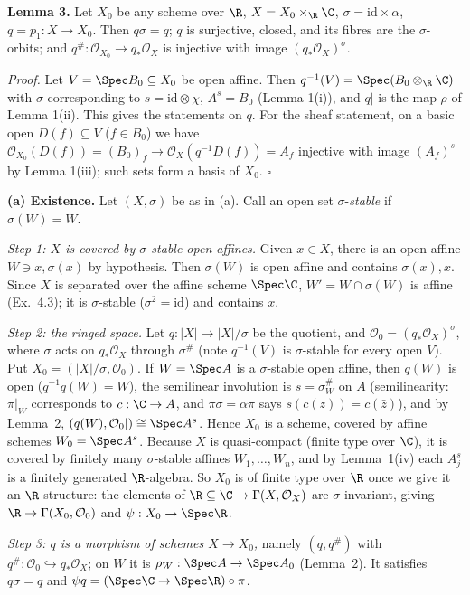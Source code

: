 \documentclass[11pt]{article}
\begin{document}
\textbf{Lemma 3.} Let $X_0$ be any scheme over $\R$, $X=X_0\times_{\R}\C$, $\sigma=\mathrm{id}\times\alpha$, $q=p_1:X\to X_0$. Then $q\sigma=q$; $q$ is surjective, closed, and its fibres are the $\sigma$-orbits; and $q^\#:\mathcal O_{X_0}\to q_*\mathcal O_X$ is injective with image $(q_*\mathcal O_X)^\sigma$.

\emph{Proof.} Let $V=\Spec B_0\subseteq X_0$ be open affine. Then $q^{-1}(V)=\Spec(B_0\otimes_{\R}\C)$ with $\sigma$ corresponding to $s=\mathrm{id}\otimes\chi$, $A^s=B_0$ (Lemma 1(i)), and $q|$ is the map $\rho$ of Lemma 1(ii). This gives the statements on $q$. For the sheaf statement, on a basic open $D(f)\subseteq V$ ($f\in B_0$) we have $\mathcal O_{X_0}(D(f))=(B_0)_f\to\mathcal O_X(q^{-1}D(f))=A_f$ injective with image $(A_f)^s$ by Lemma 1(iii); such sets form a basis of $X_0$. $\square$

\textbf{(a) Existence.} Let $(X,\sigma)$ be as in (a). Call an open set $\sigma$-\emph{stable} if $\sigma(W)=W$.

\emph{Step 1: $X$ is covered by $\sigma$-stable open affines.} Given $x\in X$, there is an open affine $W\ni x,\sigma(x)$ by hypothesis. Then $\sigma(W)$ is open affine and contains $\sigma(x),x$. Since $X$ is separated over the affine scheme $\Spec\C$, $W'=W\cap\sigma(W)$ is affine (Ex.~4.3); it is $\sigma$-stable ($\sigma^2=\mathrm{id}$) and contains $x$.

\emph{Step 2: the ringed space.} Let $q:|X|\to|X|/\sigma$ be the quotient, and $\mathcal O_0=(q_*\mathcal O_X)^\sigma$, where $\sigma$ acts on $q_*\mathcal O_X$ through $\sigma^\#$ (note $q^{-1}(V)$ is $\sigma$-stable for every open $V$). Put $X_0=(|X|/\sigma,\mathcal O_0)$. If $W=\Spec A$ is a $\sigma$-stable open affine, then $q(W)$ is open ($q^{-1}q(W)=W$), the semilinear involution is $s=\sigma^\#_W$ on $A$ (semilinearity: $\pi|_W$ corresponds to $c:\C\to A$, and $\pi\sigma=\alpha\pi$ says $s(c(z))=c(\bar z)$), and by Lemma~2, $(q(W),\mathcal O_0|)\cong\Spec A^s$. Hence $X_0$ is a scheme, covered by affine schemes $W_0=\Spec A^s$. Because $X$ is quasi-compact (finite type over $\C$), it is covered by finitely many $\sigma$-stable affines $W_1,\dots,W_n$, and by Lemma~1(iv) each $A_j^{s}$ is a finitely generated $\R$-algebra. So $X_0$ is of finite type over $\R$ once we give it an $\R$-structure: the elements of $\R\subseteq\C\to\Gamma(X,\mathcal O_X)$ are $\sigma$-invariant, giving $\R\to\Gamma(X_0,\mathcal O_0)$ and $\psi:X_0\to\Spec\R$.

\emph{Step 3: $q$ is a morphism of schemes $X\to X_0$,} namely $(q,q^\#)$ with $q^\#:\mathcal O_0\hookrightarrow q_*\mathcal O_X$; on $W$ it is $\rho_W:\Spec A\to\Spec A_0$ (Lemma~2). It satisfies $q\sigma=q$ and $\psi q=(\Spec\C\to\Spec\R)\circ\pi$.
\end{document}
